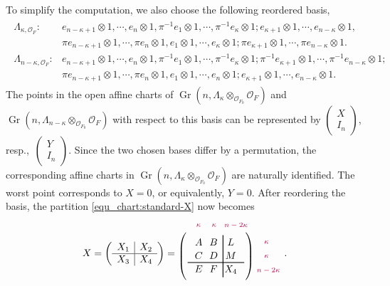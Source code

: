 \documentclass[pdflatex,sn-mathphys-num]{sn-jnl}%
\theoremstyle{thmstyleone}%
\theoremstyle{thmstyletwo}%
\numberwithin{equation}{subsection}
\theoremstyle{thmstylethree}%
\newcommand{\CO}{\ensuremath{\mathcal{O}}\xspace}
\DeclareMathOperator{\Gr}{Gr}
\begin{document}
To simplify the computation, we also choose the following reordered basis,
\begin{align}\label{equ_chart:reordered-basis}
	\begin{split}
		\Lambda_{\kappa,\CO_F}:  &
		e_{n-\kappa+1}\otimes 1,\cdots, e_n\otimes 1,	
		\pi^{-1}e_1\otimes 1,\cdots,\pi^{-1}e_{\kappa}\otimes 1;	
		e_{\kappa+1}\otimes 1,\cdots, e_{n-\kappa}\otimes 1,\\
		&   
		\pi e_{n-\kappa+1}\otimes 1,\cdots, \pi e_n\otimes 1,
		e_1\otimes 1,\cdots,  e_{\kappa}\otimes 1; 	
		\pi e_{\kappa+1}\otimes 1,\cdots,\pi e_{n-\kappa}\otimes 1.\\
		\Lambda_{n-\kappa,\CO_F}:&
		e_{n-\kappa+1}\otimes 1,\cdots, e_n\otimes 1,	
		\pi^{-1}e_1\otimes 1,\cdots,\pi^{-1}e_{\kappa}\otimes 1;
		\pi^{-1} e_{\kappa+1}\otimes 1,\cdots,\pi^{-1} e_{n-\kappa}\otimes 1;\\
		&   
		\pi e_{n-\kappa+1}\otimes 1,\cdots, \pi e_n\otimes 1,
		e_1\otimes 1,\cdots,  e_{n}\otimes 1;	
		e_{\kappa+1}\otimes 1,\cdots, e_{n-\kappa}\otimes 1.
	\end{split}
\end{align}
The points in the open affine charts of $\Gr(n,\Lambda_\kappa\otimes_{\CO_{F_0}}\CO_F)$ and $\Gr(n,\Lambda_{n-\kappa}\otimes_{\CO_{F_0}}\CO_F)$ with respect to this basis can be represented by 
$\left(\begin{matrix}
	X\\I_n
\end{matrix}\right)$, resp.,\ $\left(\begin{matrix}
	Y\\I_n
\end{matrix}\right)$.
Since the two chosen bases differ by a permutation, the corresponding affine charts in $\Gr(n,\Lambda_\kappa\otimes_{\CO_{F_0}}\CO_F)$ are naturally identified.
The worst point corresponds to $X=0$, or equivalently, $Y=0$.
After reordering the basis, the partition \eqref{equ_chart:standard-X} now becomes
\begin{equation}\label{equ_chart:reordered-X}
	X=
	\left(\begin{array}{c|c}
		X_1&X_2\\
		\hline
		X_3&X_4
	\end{array}\right)=	
	\begin{tikzpicture}[>=stealth,thick,baseline]
		\matrix [matrix of math nodes,left delimiter=(,right delimiter=)](A){ 
					A		&	B	&	L\\
					C	&	D		&	M\\
					E		&	F	&	X_4\\
				};
		\filldraw[purple] (2.0,0.5) circle (0pt) node [anchor=east]{\fontsize{7}{8} $\kappa$};
		\filldraw[purple] (2.0,0) circle (0pt) node [anchor=east]{\fontsize{7}{8} $\kappa$};
		\filldraw[purple] (2.4,-0.5) circle (0pt) node [anchor=east]{\fontsize{7}{8} $n-2\kappa$};
		\filldraw[purple] (-0.4,1.1) circle (0pt) node [anchor=east]{\fontsize{7}{8} $\kappa$};
		\filldraw[purple] (0.15,1.1) circle (0pt) node [anchor=east]{\fontsize{7}{8} $\kappa$};
		\filldraw[purple] (0.65,1.1) circle (0pt) node [anchor=center]{\fontsize{7}{8}	$n-2\kappa$};
		\draw (-1,-0.225) -- (1,-0.225);
		\draw (0.25,-0.75) -- (0.25,0.75);
	\end{tikzpicture}.
\end{equation}
\end{document}
